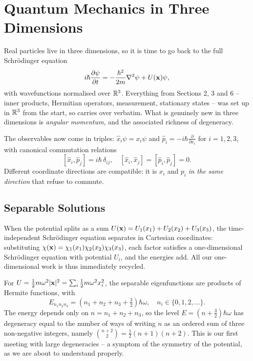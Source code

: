 \documentclass[a4paper]{scrartcl}
\begin{document}
\section{Quantum Mechanics in Three Dimensions}

Real particles live in three dimensions, so it is time to go back to the full Schr\"odinger equation
$$
i \hbar \frac{\partial \psi}{\partial t} = -\frac{\hbar^2}{2m} \nabla^2 \psi + U(\mathbf{x}) \psi,
$$
with wavefunctions normalised over $\mathbb{R}^3$. Everything from Sections 2, 3 and 6 -- inner products, Hermitian operators, measurement, stationary states -- was set up in $\mathbb{R}^3$ from the start, so carries over verbatim. What is genuinely new in three dimensions is \emph{angular momentum}, and the associated richness of degeneracy.

The observables now come in triples: $\hat{x}_i \psi = x_i \psi$ and $\hat{p}_i = -i\hbar \frac{\partial}{\partial x_i}$ for $i = 1, 2, 3$, with canonical commutation relations
$$
[\hat{x}_i, \hat{p}_j] = i \hbar \, \delta_{ij}, \quad [\hat{x}_i, \hat{x}_j] = [\hat{p}_i, \hat{p}_j] = 0.
$$
Different coordinate directions are compatible: it is $x_i$ and $p_i$ \emph{in the same direction} that refuse to commute.

\subsection{Separable Solutions}

When the potential splits as a sum $U(\mathbf{x}) = U_1(x_1) + U_2(x_2) + U_3(x_3)$, the time-independent Schr\"odinger equation separates in Cartesian coordinates: substituting $\chi(\mathbf{x}) = \chi_1(x_1)\chi_2(x_2)\chi_3(x_3)$, each factor satisfies a one-dimensional Schr\"odinger equation with potential $U_i$, and the energies add. All our one-dimensional work is thus immediately recycled.

\begin{example}
    For $U = \frac{1}{2} m \omega^2 \lvert\mathbf{x}\rvert^2 = \sum_i \frac{1}{2}m\omega^2 x_i^2$, the separable eigenfunctions are products of Hermite functions, with
    $$
    E_{n_1 n_2 n_3} = \left( n_1 + n_2 + n_3 + \tfrac{3}{2} \right) \hbar \omega, \quad n_i \in \{0, 1, 2, \dots\}.
    $$
    The energy depends only on $n = n_1 + n_2 + n_3$, so the level $E = (n + \frac{3}{2})\hbar\omega$ has degeneracy equal to the number of ways of writing $n$ as an ordered sum of three non-negative integers, namely $\binom{n+2}{2} = \frac{1}{2}(n+1)(n+2)$. This is our first meeting with large degeneracies -- a symptom of the symmetry of the potential, as we are about to understand properly.
\end{example}
\end{document}
